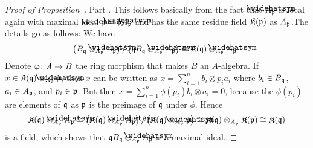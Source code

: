 \documentclass[a4paper,parskip=half,numbers=enddot, DIV=12]{scrreprt}
\begin{document}
\begin{proof}[Proof of Proposition~]
	Part . This follows basically from the fact that $\roof{A}_\pp$ is local again with maximal ideal $\roof{\pp}=\pp\roof{A}_\pp$ and has the same residue field $\mathfrak{K}(\mathfrak{p})$ as $A_{\mathfrak{p}}$.The details go as follows: We have
	\begin{align*}
	\left(B_\qq\otimes_{A_\pp}\roof{A}_\pp\right)/\left(\qq B_\qq\otimes_{A_\pp}\roof{A}_\pp\right)\cong \KK(\qq)\otimes_{A_\pp}\roof{A}_\pp\;.
	\end{align*}
	Denote $\phi\colon A\morphism B$ the ring morphism that makes $B$ an $A$-algebra. If $x\in \KK(\qq)\otimes_{A_\pp}\roof{\pp}$, then $x$ can be written as $x=\sum_{i=1}^{n}b_i\otimes p_ia_i$ where $b_i\in B_{\mathfrak{q}}$, $a_i\in A_{\mathfrak{p}}$, and $p_i\in \mathfrak{p}$. But then $x=\sum_{i=1}^{n}\phi(p_i)b_i\otimes a_i=0$, because the $\phi(p_i)$ are elements of $\mathfrak{q}$ as $\mathfrak{p}$ is the preimage of $\mathfrak{q}$ under $\phi$. Hence
	\begin{align*}
	\KK(\qq)\otimes_{A_\pp}\roof{A}_\pp\cong \left(\KK(\qq)\otimes_{A_\pp}\roof{A}_\pp\right)/\left(\KK(\qq)\otimes_{A_\pp}\roof{\pp}\right)\cong \KK(\qq)\otimes_{A_\pp}\KK(\pp)\cong \KK(\qq)
	\end{align*}
	is a field, which shows that $\qq B_\qq\otimes_{A_\pp}\roof{A}_\pp$ is a maximal ideal.
	

\end{proof}
\end{document}
